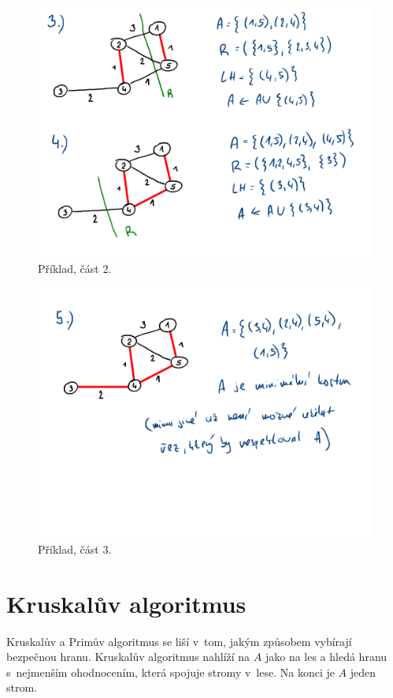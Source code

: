 \begin{figure}[H]
    \centering
    \includegraphics[width=0.9\linewidth]{03-minimalni-kostry-7.pdf}
    \caption{Příklad, část 2.}
\end{figure}

\begin{figure}[H]
    \centering
    \includegraphics[width=0.9\linewidth]{03-minimalni-kostry-8.pdf}
    \caption{Příklad, část 3.}
\end{figure}


\section{Kruskalův algoritmus}

Kruskalův a Primův algoritmus se liší v~tom, jakým způsobem vybírají bezpečnou hranu. Kruskalův algoritmus nahlíží na $A$ jako na les a hledá hranu s~nejmenším ohodnocením, která spojuje stromy v~lese. Na konci je $A$ jeden strom.

